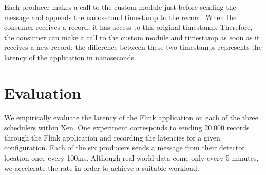 \documentclass{article}
\begin{document}
Each producer makes a call to the custom module just before sending the message and appends the nanosecond timestamp to the record. When the consumer receives a record, it has access to this original timestamp. Therefore, the consumer can make a call to the custom module and timestamp as soon as it receives a new record; the difference between these two timestamps represents the latency of the application in nanoseconds.
\section{Evaluation}
We empirically evaluate the latency of the Flink application on each of the three schedulers within Xen. One experiment corresponds to sending 20,000 records through the Flink application and recording the latencies for a given configuration. Each of the six producers sends a message from their detector location once every 100ms. Although real-world data come only every 5 minutes, we accelerate the rate in order to achieve a suitable workload.  
\end{document}
